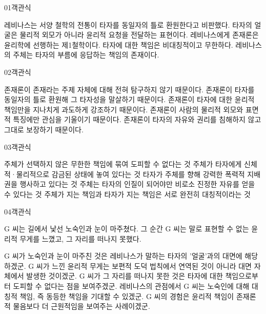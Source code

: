 \documentclass[fs85,seriesWit]{korfarm-base}
\begin{document}
\kfBeginMC
\begin{kfQBlock}{01}{객관식}
\begin{kfChoices}
\kfChoice 레비나스는 서양 철학의 전통이 타자를 동일자의 틀로 환원한다고 비판했다.
\kfChoice 타자의 얼굴은 물리적 외모가 아니라 윤리적 요청을 전달하는 표현이다.
\kfChoice 레비나스에게 존재론은 윤리학에 선행하는 제1철학이다.
\kfChoice 타자에 대한 책임은 비대칭적이고 무한하다.
\kfChoice 레비나스의 주체는 타자의 부름에 응답하는 책임의 존재이다.
\end{kfChoices}
\end{kfQBlock}

\begin{kfQBlock}{02}{객관식}
\begin{kfChoices}
\kfChoice 존재론이 존재라는 주제 자체에 대해 전혀 탐구하지 않기 때문이다.
\kfChoice 존재론이 타자를 동일자의 틀로 환원해 그 타자성을 말살하기 때문이다.
\kfChoice 존재론이 타자에 대한 윤리적 책임만을 지나치게 과도하게 강조하기 때문이다.
\kfChoice 존재론이 사람의 물리적 외모와 표면적 특징에만 관심을 기울이기 때문이다.
\kfChoice 존재론이 타자의 자유와 권리를 침해하지 않고 그대로 보장하기 때문이다.
\end{kfChoices}
\end{kfQBlock}

\begin{kfQBlock}{03}{객관식}
\begin{kfChoices}
\kfChoice 주체가 선택하지 않은 무한한 책임에 묶여 도피할 수 없다는 것
\kfChoice 주체가 타자에게 신체적·물리적으로 감금된 상태에 놓여 있다는 것
\kfChoice 타자가 주체를 향해 강력한 폭력적 지배권을 행사하고 있다는 것
\kfChoice 주체는 타자의 인질이 되어야만 비로소 진정한 자유를 얻을 수 있다는 것
\kfChoice 주체가 지는 책임과 타자가 지는 책임은 서로 완전히 대칭적이라는 것
\end{kfChoices}
\end{kfQBlock}

\begin{kfQBlock}{04}{객관식}
\begin{kfEvidence}G 씨는 길에서 낯선 노숙인과 눈이 마주쳤다. 그 순간 G 씨는 말로 표현할 수 없는 윤리적 무게를 느꼈고, 그 자리를 떠나지 못했다.\end{kfEvidence}
\begin{kfChoices}
\kfChoice G 씨가 노숙인과 눈이 마주친 것은 레비나스가 말하는 타자의 '얼굴'과의 대면에 해당하겠군.
\kfChoice G 씨가 느낀 윤리적 무게는 보편적 도덕 법칙에서 연역된 것이 아니라 대면 자체에서 발생한 것이겠군.
\kfChoice G 씨가 그 자리를 떠나지 못한 것은 타자에 대한 책임으로부터 도피할 수 없다는 점을 보여주겠군.
\kfChoice 레비나스의 관점에서 G 씨는 노숙인에 대해 대칭적 책임, 즉 동등한 책임을 기대할 수 있겠군.
\kfChoice G 씨의 경험은 윤리적 책임이 존재론적 물음보다 더 근원적임을 보여주는 사례이겠군.
\end{kfChoices}
\end{kfQBlock}
\end{document}
